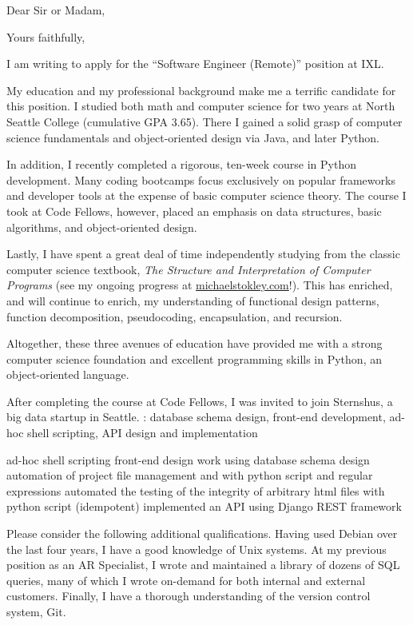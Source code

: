 \documentclass[10pt,a4paper,sans]{moderncv}        %
\begin{document}
\date{\today{}}
\opening{Dear Sir or Madam,}
\closing{Yours faithfully,}
\makelettertitle

I am writing to apply for the ``Software Engineer (Remote)'' position at IXL.

My education and my professional background make me a terrific candidate for
this position. I studied both math and computer science for two years at North
Seattle College (cumulative GPA 3.65). There I gained a solid grasp of computer science fundamentals and
object-oriented design via Java, and later Python. 

In addition, I recently completed a rigorous, ten-week course in Python
development. Many coding bootcamps focus exclusively on popular frameworks and
developer tools at the expense of basic computer science theory. The course I
took at Code Fellows, however, placed an emphasis on data structures, basic
algorithms, and object-oriented design. 

Lastly, I have spent a great deal of time independently studying from the classic computer science textbook, \textit{The Structure and Interpretation of Computer Programs} (see my ongoing progress at {\href{http://michaelstokley.com}{michaelstokley.com}}!). This has enriched, and will continue to enrich, my understanding of functional design patterns, function decomposition, pseudocoding, encapsulation, and recursion.

Altogether, these three avenues of education have provided me with a strong computer
science foundation and excellent programming skills in Python, an object-oriented language.

After completing the course at Code Fellows, I was invited to join Sternshus, a
big data startup in Seattle. : database
schema design, front-end development, ad-hoc shell scripting, API design and
implementation

ad-hoc shell scripting
front-end design work using
database schema design
automation of project file management and with python script and regular expressions
automated the testing of the integrity of arbitrary html files with python
script (idempotent)
implemented an API using Django REST framework


Please consider the following additional qualifications. Having used Debian over
the last four years, I have a good knowledge of Unix systems. At my previous
position as an AR Specialist, I wrote and maintained a library of dozens of SQL
queries, many of which I wrote on-demand for both internal and external
customers. Finally, I have a thorough understanding of the version control
system, Git.
\end{document}
